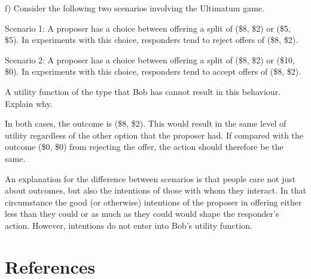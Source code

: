 \documentclass[
  letterpaper,
  DIV=11,
  numbers=noendperiod]{scrreprt}
\begin{document}
f) Consider the following two scenarios involving the Ultimatum game.

Scenario 1: A proposer has a choice between offering a split of (\$8,
\$2) or (\$5, \$5). In experiments with this choice, responders tend to
reject offers of (\$8, \$2).

Scenario 2: A proposer has a choice between offering a split of (\$8,
\$2) or (\$10, \$0). In experiments with this choice, responders tend to
accept offers of (\$8, \$2).

A utility function of the type that Bob has cannot result in this
behaviour. Explain why.

\begin{tcolorbox}[enhanced jigsaw, title=\textcolor{quarto-callout-tip-color}{\faLightbulb}\hspace{0.5em}{Answer}, toprule=.15mm, colback=white, breakable, titlerule=0mm, colframe=quarto-callout-tip-color-frame, coltitle=black, opacityback=0, rightrule=.15mm, colbacktitle=quarto-callout-tip-color!10!white, bottomtitle=1mm, opacitybacktitle=0.6, arc=.35mm, bottomrule=.15mm, toptitle=1mm, leftrule=.75mm, left=2mm]

In both cases, the outcome is (\$8, \$2). This would result in the same
level of utility regardless of the other option that the proposer had.
If compared with the outcome (\$0, \$0) from rejecting the offer, the
action should therefore be the same.

An explanation for the difference between scenarios is that people care
not just about outcomes, but also the intentions of those with whom they
interact. In that circumstance the good (or otherwise) intentions of the
proposer in offering either less than they could or as much as they
could would shape the responder's action. However, intentions do not
enter into Bob's utility function.

\end{tcolorbox}


\hypertarget{references}{%
\chapter*{References}\label{references}}

\end{document}
